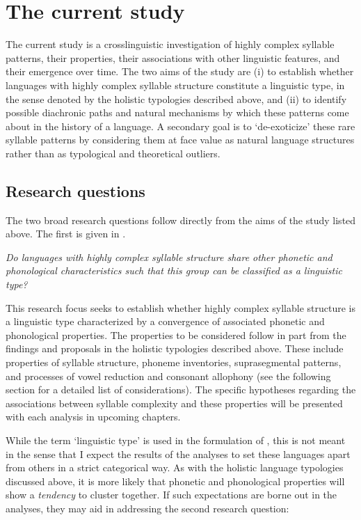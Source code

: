 \section{The current study}\label{sec:1.4}

  The current study is a crosslinguistic investigation of highly complex syllable patterns, their properties, their associations with other linguistic features, and their emergence over time. The two aims of the study are (i) to establish whether languages with highly complex syllable structure constitute a linguistic type, in the sense denoted by the holistic typologies described above, and (ii) to identify possible diachronic paths and natural mechanisms by which these patterns come about in the history of a language. A secondary goal is to ‘de-exoticize’ these rare syllable patterns by considering them at face value as natural language structures rather than as typological and theoretical outliers.

\subsection{Research questions}\label{sec:1.4.1}

  The two broad research questions follow directly from the aims of the study listed above. The first is given in .

\ea\label{ex:1.23}
   \textit{Do languages with highly complex syllable structure share other phonetic and phonological characteristics such that this group can be classified as a linguistic type?}
\z

  This research focus seeks to establish whether highly complex syllable structure is a linguistic type characterized by a convergence of associated phonetic and phonological properties. The properties to be considered follow in part from the findings and proposals in the holistic typologies described above. These include properties of syllable structure, phoneme inventories, suprasegmental patterns, and processes of vowel reduction and consonant allophony (see the following section for a detailed list of considerations). The specific hypotheses regarding the associations between syllable complexity and these properties will be presented with each analysis in upcoming chapters.

  While the term ‘linguistic type’ is used in the formulation of , this is not meant in the sense that I expect the results of the analyses to set these languages apart from others in a strict categorical way. As with the holistic language typologies discussed above, it is more likely that phonetic and phonological properties will show a \textit{tendency} to cluster together. If such expectations are borne out in the analyses, they may aid in addressing the second research question:

